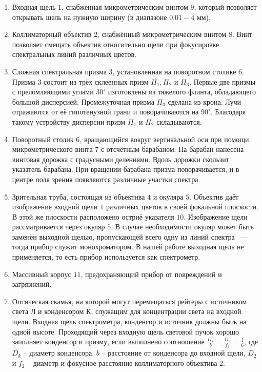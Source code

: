 \begin{enumerate}
  \item Входная щель $1$, снабжённая микрометрическим винтом $9$, который
        позволяет открывать щель на нужную ширину (в диапазоне $0.01-4$ мм).
  \item Коллиматорный объектив $2$, снабжённый микрометрическим винтом $8$. Винт
        позволяет смещать объектив относительно щели при фокусировке спектральных
        линий различных цветов.
  \item Сложная спектральная призма $3$, установленная на поворотном столике
        $6$. Призма $3$ состоит из трёх склеенных призм $\Pi_1, \Pi_2$ и
        $\Pi_3$. Первые две призмы с преломляющими углами $30^{\circ}$
        изготовлены из тяжелого флинта, обладающего большой дисперсией.
        Промежуточная призма $\Pi_3$ сделана из крона. Лучи отражаются от её
        гипотенузной грани и поворачиваются на $90^{\circ}$. Благодаря такому
        устройству дисперсии призм $\Pi_1$ и $\Pi_2$ складываются.
  \item Поворотный столик $6$, вращающийся вокруг вертикальной оси при помощи
        микрометрического винта $7$ с отсчётным барабаном. На барабан нанесена
        винтовая дорожка с градусными делениями. Вдоль дорожки скользит указатель
        барабана. При вращении барабана призма поворачивается, и в центре поля зрения
        появляются различные участки спектра.
  \item Зрительная труба, состоящая из объектива $4$ и окуляра $5$. Объектив
        даёт изображение входной щели $1$ различных цветов в своей фокальной
        плоскости. В этой же плоскости расположено остриё указателя $10$. Изображение
        щели рассматривается через окуляр $5$. В случае необходимости окуляр может
        быть заменён выходной щелью, пропускающей всего одну из линий спектра ~---~
        тогда прибор служит монохроматором. В нашей работе выходная щель не
        применяется, то есть прибор используется как спектрометр.
  \item Массивный корпус $11$, предохраняющий прибор от повреждений и
        загрязнений.
  \item Оптическая скамья, на которой могут перемещаться рейтеры с источником
        света Л и конденсором К, служащим для концентрации света на входной щели.
        Входная щель спектрометра, конденсор и источник должны быть на одной высоте.
        Проходящий через входную щель световой пучок хорошо заполняет конденсор и
        призму, если выполнено соотношение $\frac{D_k}{b} = \frac{D_2}{f_2} =
          \frac{1}{6}$, где $D_k$ -- диаметр конденсора, $b$ -- расстояние от конденсора
        до входной щели, $D_2$ и $f_2$ -- диаметр и фокусное расстояние коллиматорного
        объектива $2$.


\end{enumerate}
